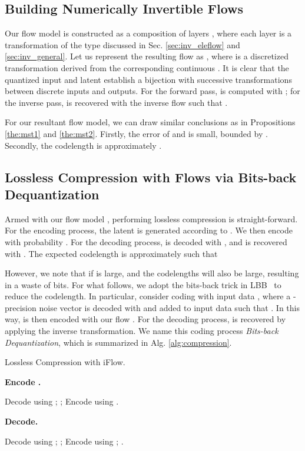 \documentclass{article}
\begin{document}
\subsection{Building Numerically Invertible Flows}
\label{sec:inv_model}

Our flow model is constructed as a composition of layers , where each layer is a transformation of the type discussed in Sec. \ref{sec:inv_eleflow} and \ref{sec:inv_general}. Let us represent the resulting flow as , where  is a discretized transformation derived from the corresponding continuous . It is clear that the quantized input  and latent  establish a bijection with successive transformations between discrete inputs and outputs. For the forward pass,  is computed with ; for the inverse pass,  is recovered with the inverse flow  such that .

For our resultant flow model, we can draw similar conclusions as in Propositions \ref{the:mst1} and \ref{the:mst2}. Firstly, the error of  and  is small, bounded by . Secondly, the codelength is approximately .

\subsection{Lossless Compression with Flows via Bits-back Dequantization}
\label{sec:inv_deq}

Armed with our flow model , performing lossless compression is straight-forward. For the encoding process, the latent is generated according to . We then encode  with probability . For the decoding process,  is decoded with , and  is recovered with . The expected codelength is approximately  such that

However, we note that if  is large,  and the codelengths will also be large, resulting in a waste of bits. For what follows, we adopt the bits-back trick in LBB~\cite{ho2019compression} to reduce the codelength. In particular, consider coding with input data , where a -precision noise vector  is decoded with  and added to input data such that . In this way,  is then encoded with our flow . For the decoding process,  is recovered by applying the inverse transformation. We name this coding process \textit{Bits-back Dequantization}, which is summarized in Alg. \ref{alg:compression}.

\begin{algorithm}[h]
\small
\caption{Lossless Compression with iFlow.}
\begin{multicols}{2} 
\textbf{Encode .} 

\begin{algorithmic}[1]
\STATE Decode  using ;
\STATE ;
\STATE Encode  using .
\end{algorithmic}

\textbf{Decode.} 

\begin{algorithmic}[1]
\STATE Decode  using ;
\STATE ;
\STATE Encode  using ;
\RETURN .
\end{algorithmic}
\end{multicols}
\vspace{-8pt}
\label{alg:compression}
\end{algorithm}
\end{document}
